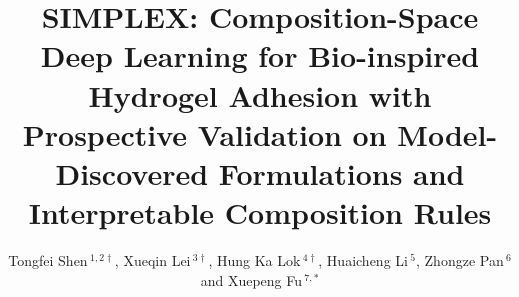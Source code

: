 \documentclass[utf8]{FrontiersinHarvard}
\def\firstAuthorLast{Shen, Lei, Hung, Li, Pan and Fu {et~al.}}
\def\Authors{Tongfei Shen\,$^{1,2\dagger}$, Xueqin Lei\,$^{3\dagger}$, Hung Ka Lok\,$^{4\dagger}$, Huaicheng Li\,$^{5}$, Zhongze Pan\,$^{6}$ and Xuepeng Fu\,$^{7,*}$}
\begin{document}
\onecolumn
{}

\title[SIMPLEX composition-space deep learning for hydrogel adhesion screening]{SIMPLEX: Composition-Space Deep Learning for Bio-inspired Hydrogel Adhesion with Prospective Validation on Model-Discovered Formulations and Interpretable Composition Rules}

\author[\firstAuthorLast ]{\Authors}
\address{}
\correspondance{}
\extraAuth{}
\maketitle

\begin{abstract}
\section{}

\end{abstract}
\end{document}
